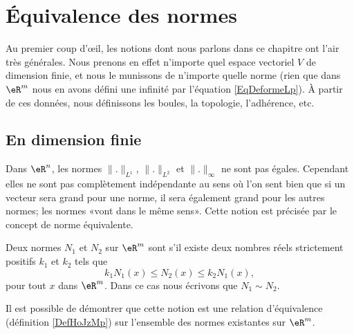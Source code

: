 
\section{Équivalence des normes}
\label{normes_equiv}

Au premier coup d'œil, les notions dont nous parlons dans ce chapitre ont l'air très générales. Nous prenons en effet n'importe quel espace vectoriel $V$ de dimension finie, et nous le munissons de n'importe quelle norme (rien que dans $\eR^m$ nous en avons défini une infinité par l'équation \eqref{EqDeformeLp}). À partir de ces données, nous définissons les boules, la topologie, l'adhérence, etc.

\subsection{En dimension finie}

Dans $\eR^n$, les normes $\| . \|_{L^1}$, $\| . \|_{L^2}$ et $\| . \|_{\infty}$ ne sont pas égales. Cependant elles ne sont pas complètement indépendante au sens où l'on sent bien que si un vecteur sera grand pour une norme, il sera également grand pour les autres normes; les normes «vont dans le même sens». Cette notion est précisée par le concept de norme équivalente. 

\begin{definition}		\label{DefEquivNorm}
    Deux normes $N_1$ et $N_2$ sur $\eR^m$ sont  s'il existe deux nombres réels strictement positifs $k_1$ et $k_2$ tels que
	\begin{equation}
		k_1N_1(x)\leq N_2(x)\leq k_2 N_1(x),
	\end{equation}
	pour tout $x$ dans $\eR^m$. Dans ce cas nous écrivons que $N_1\sim N_2$.
\end{definition}
Il est possible de démontrer que cette notion est une relation d'équivalence (définition \ref{DefHoJzMp}) sur l'ensemble des normes existantes sur $\eR^m$.

